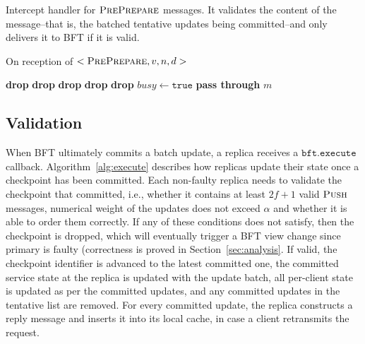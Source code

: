\documentclass[twocolumn,10pt]{article}
\begin{document}
{\begin{algorithm}
\small
\caption{Intercept handler for $\textsc{PrePrepare}$ messages. It validates
 the content of the message--that is, the batched tentative updates
 being committed--and only delivers it to BFT if it is valid.}
On reception of $<\textsc{PrePrepare}, v, n, d>$
\begin{algorithmic}[1]\label{alg:receivePrePrepare}
    \STATE \textbf{drop}
	\STATE \textbf{drop}
	\label{lin:maxPrePrepareBatchWeight}
	\STATE \textbf{drop}
       \label{lin:updateInclusion}
       \STATE \textbf{drop}
	\label{lin:clientUpdateOrdering}
	\STATE \textbf{drop}
\ELSE
\STATE $\mathit{busy} \leftarrow \mathtt{true}$ 
\STATE \textbf{pass through} $m$ 
\ENDIF
\end{algorithmic}
\end{algorithm}

\fi

\subsection{Validation}
When BFT ultimately commits a batch update, a replica receives a
$\mathtt{bft.execute}$ callback. Algorithm~\ref{alg:execute} describes
how replicas update their state once a checkpoint has been committed.
Each non-faulty replica needs to validate the checkpoint that committed, i.e.,
whether it contains at least $2f+1$ valid $\textsc{Push}$ messages, numerical weight
of the updates does not exceed $\alpha$ and whether it is able to order them 
correctly. If any of these conditions does not satisfy, then the checkpoint is
dropped, which will eventually trigger a BFT view change since primary is faulty
(correctness is proved in Section~\ref{sec:analysis}. If valid,
the checkpoint identifier is advanced to the latest committed one, the
committed service state at the replica is updated with the 
update batch, all per-client state is updated as per the committed
updates, and any committed updates in the tentative list are
removed. For every committed update, the replica constructs a reply
message and inserts it into its local cache, in case a client
retransmits the request.

}
\end{document}
